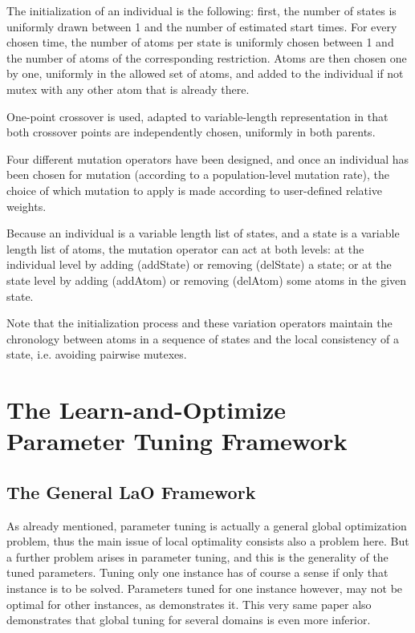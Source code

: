 \documentclass{acm_proc_article-sp}
\begin{document}
The initialization of an individual is the following: first, the number of states is uniformly drawn between 1 and the number of estimated start times.  For every chosen time, the number of atoms per state is uniformly chosen between 1 and the number of atoms of the corresponding restriction. Atoms are then chosen one by one, uniformly in the allowed set of atoms, and added to the individual if not mutex with any other atom that is already there.

One-point crossover is used, adapted to variable-length representation in that both crossover points are independently chosen, uniformly in both parents.

Four different mutation operators have been designed, and once an individual has been chosen for mutation (according to a population-level mutation rate), the choice of which mutation to apply is made according to user-defined relative weights. 

Because an individual is a variable length list of states, and a state is a variable length list of atoms, the mutation 
operator can act at both levels: at the individual level by adding (addState) or removing (delState) 
a state; or at the state level by adding (addAtom) or removing (delAtom) some atoms in the given state. 

Note that the initialization process and these variation operators maintain the chronology between atoms in a sequence of states and the local consistency of a state, i.e. avoiding pairwise mutexes.

\section{The Learn-and-Optimize Parameter Tuning Framework}
\label{section:LaO}

\subsection{The General LaO Framework}

As already mentioned, parameter tuning is actually a general global optimization problem, thus the main issue of local optimality consists also a problem here. But a further problem arises in parameter tuning, and this is the generality of the tuned parameters. Tuning only one instance has of course a sense if only that instance is to be solved. Parameters tuned for one instance however, may not be optimal for other instances, as \cite{BibGECCO:2010} demonstrates it. This very same paper also demonstrates that global tuning for several domains is even more inferior.
\end{document}
